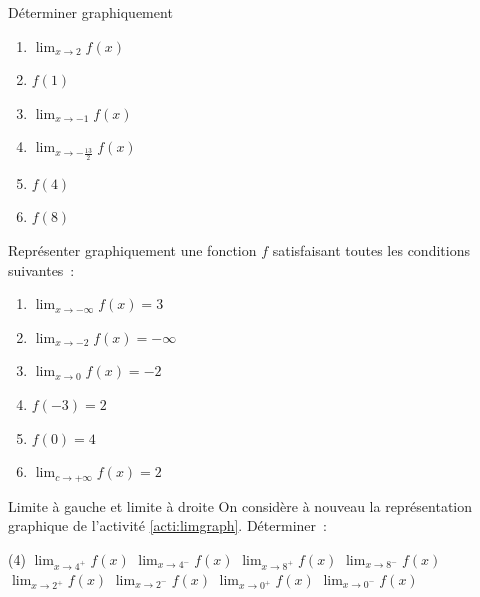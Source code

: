 \documentclass[a4paper,12pt]{article}
\begin{document}
\begin{activite}[label=acti:limgraph]
\begin{center}
\end{center}
\begin{tasks}
	\task
	Déterminer graphiquement
	\begin{multicols}{3}
		\begin{enumerate}	
		\item $\displaystyle{\lim_{x\rightarrow 2}f(x)}$ 
		\item $f(1)$
		\item $\displaystyle{\lim_{x\rightarrow -1}f(x)}$
		\item $\displaystyle{\lim_{x\rightarrow -\tfrac{13}{2}}f(x)}$
		\item $f(4)$
		\item $f(8)$
		\end{enumerate}
	\end{multicols}
	\task Représenter graphiquement une fonction $f$ satisfaisant toutes les conditions suivantes~:
	\begin{multicols}{3}	
	\begin{enumerate}
		\item $\displaystyle{\lim_{x\rightarrow -\infty}f(x)=3}$
		\item $\displaystyle{\lim_{x\rightarrow -2}f(x)=-\infty}$
		\item $\displaystyle{\lim_{x\rightarrow 0}f(x)=-2}$
		\item $f(-3)=2$
		\item $f(0)=4$
		\item $\displaystyle{\lim_{c\rightarrow +\infty}f(x)=2}$ 
		
	\end{enumerate}
	\end{multicols}
\end{tasks}
\end{activite}
\begin{activite}[label=acti:limdg]
	Limite à gauche et limite à droite
	\tcblower
	On considère à nouveau la représentation graphique de l'activité \ref{acti:limgraph}. Déterminer~:
	\begin{tasks}(4)
		\task $\displaystyle{\lim_{x\rightarrow 4^+}f(x)}$ 
		\task $\displaystyle{\lim_{x\rightarrow 4^-}f(x)}$ 
		\task $\displaystyle{\lim_{x\rightarrow 8^+}f(x)}$ 
		\task $\displaystyle{\lim_{x\rightarrow 8^-}f(x)}$ 
		\task $\displaystyle{\lim_{x\rightarrow 2^+}f(x)}$ 
		\task $\displaystyle{\lim_{x\rightarrow 2^-}f(x)}$ 
		\task $\displaystyle{\lim_{x\rightarrow 0^+}f(x)}$ 
		\task $\displaystyle{\lim_{x\rightarrow 0^-}f(x)}$ 
		
	\end{tasks}
\end{activite}
\end{document}
